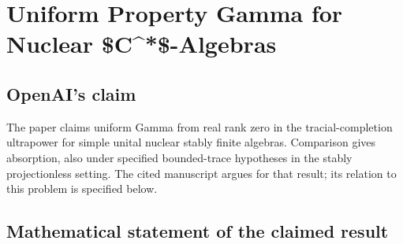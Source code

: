 \documentclass[11pt]{article}
\begin{document}
\section*{Uniform Property Gamma for Nuclear \$C\textasciicircum{}*\$-Algebras}

\subsection{OpenAI's claim}
The paper claims uniform Gamma from real rank zero in the tracial-completion ultrapower for simple unital nuclear stably finite algebras. Comparison gives absorption, also under specified bounded-trace hypotheses in the stably projectionless setting. The cited manuscript argues for that result; its relation to this problem is specified below.

\subsection{Mathematical statement of the claimed result}
\end{document}
